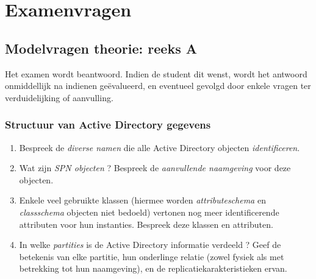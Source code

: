 \documentclass{report}
\begin{document}
	\part{Examenvragen}
	\chapter{Modelvragen theorie: reeks A}
	Het examen wordt  beantwoord. Indien de student dit wenst, wordt het antwoord onmiddellijk na indienen geëvalueerd, en eventueel gevolgd door enkele vragen ter verduidelijking of aanvulling.
	
	\section{Structuur van Active Directory gegevens}
	\begin{enumerate}
		\item Bespreek de \textit{diverse namen} die alle Active Directory objecten \textit{identificeren}. 
		
		\item Wat zijn \textit{SPN objecten} ? Bespreek de \textit{aanvullende naamgeving} voor deze objecten. 
		
		\item Enkele veel gebruikte klassen (hiermee worden \textit{attributeschema} en \textit{classschema} objecten niet bedoeld) vertonen nog meer identificerende attributen voor hun instanties. Bespreek deze klassen en attributen.
		
		\item In welke \textit{partities} is de Active Directory informatie verdeeld ? Geef de betekenis van elke partitie, hun onderlinge relatie (zowel fysiek als met betrekking tot hun naamgeving), en de replicatiekarakteristieken ervan. 
	\end{enumerate}
\end{document}
